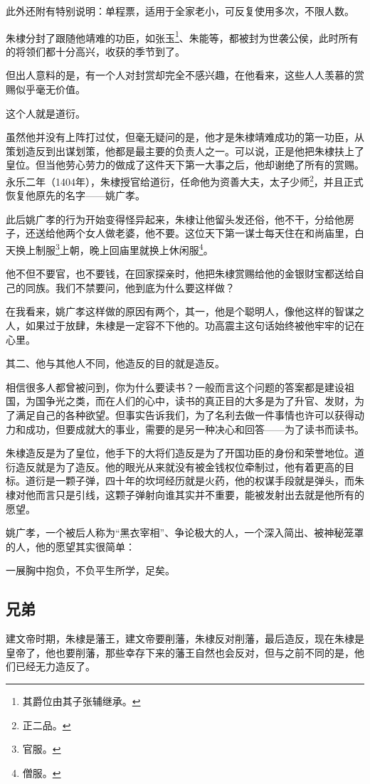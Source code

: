 \begin{multicols}{\theparacolNo}
此外还附有特别说明：单程票，适用于全家老小，可反复使用多次，不限人数。

朱棣分封了跟随他靖难的功臣，如张玉\footnote{其爵位由其子张辅继承。}、朱能等，都被封为世袭公侯，此时所有的将领们都十分高兴，收获的季节到了。

但出人意料的是，有一个人对封赏却完全不感兴趣，在他看来，这些人人羡慕的赏赐似乎毫无价值。

这个人就是道衍。

虽然他并没有上阵打过仗，但毫无疑问的是，他才是朱棣靖难成功的第一功臣，从策划造反到出谋划策，他都是最主要的负责人之一。可以说，正是他把朱棣扶上了皇位。但当他劳心劳力的做成了这件天下第一大事之后，他却谢绝了所有的赏赐。永乐二年（1404年），朱棣授官给道衍，任命他为资善大夫，太子少师\footnote{正二品。}，并且正式恢复他原先的名字——姚广孝。

此后姚广孝的行为开始变得怪异起来，朱棣让他留头发还俗，他不干，分给他房子，还送给他两个女人做老婆，他不要。这位天下第一谋士每天住在和尚庙里，白天换上制服\footnote{官服。}上朝，晚上回庙里就换上休闲服\footnote{僧服。}。

他不但不要官，也不要钱，在回家探亲时，他把朱棣赏赐给他的金银财宝都送给自己的同族。我们不禁要问，他到底为什么要这样做？

在我看来，姚广孝这样做的原因有两个，其一，他是个聪明人，像他这样的智谋之人，如果过于放肆，朱棣是一定容不下他的。功高震主这句话始终被他牢牢的记在心里。

其二、他与其他人不同，他造反的目的就是造反。

相信很多人都曾被问到，你为什么要读书？一般而言这个问题的答案都是建设祖国，为国争光之类，而在人们的心中，读书的真正目的大多是为了升官、发财，为了满足自己的各种欲望。但事实告诉我们，为了名利去做一件事情也许可以获得动力和成功，但要成就大的事业，需要的是另一种决心和回答——为了读书而读书。

朱棣造反是为了皇位，他手下的大将们造反是为了开国功臣的身份和荣誉地位。道衍造反就是为了造反。他的眼光从来就没有被金钱权位牵制过，他有着更高的目标。道衍是一颗子弹，四十年的坎坷经历就是火药，他的权谋手段就是弹头，而朱棣对他而言只是引线，这颗子弹射向谁其实并不重要，能被发射出去就是他所有的愿望。

姚广孝，一个被后人称为“黑衣宰相”、争论极大的人，一个深入简出、被神秘笼罩的人，他的愿望其实很简单：

一展胸中抱负，不负平生所学，足矣。

\subsection{兄弟}
建文帝时期，朱棣是藩王，建文帝要削藩，朱棣反对削藩，最后造反，现在朱棣是皇帝了，他也要削藩，那些幸存下来的藩王自然也会反对，但与之前不同的是，他们已经无力造反了。


\end{multicols}
